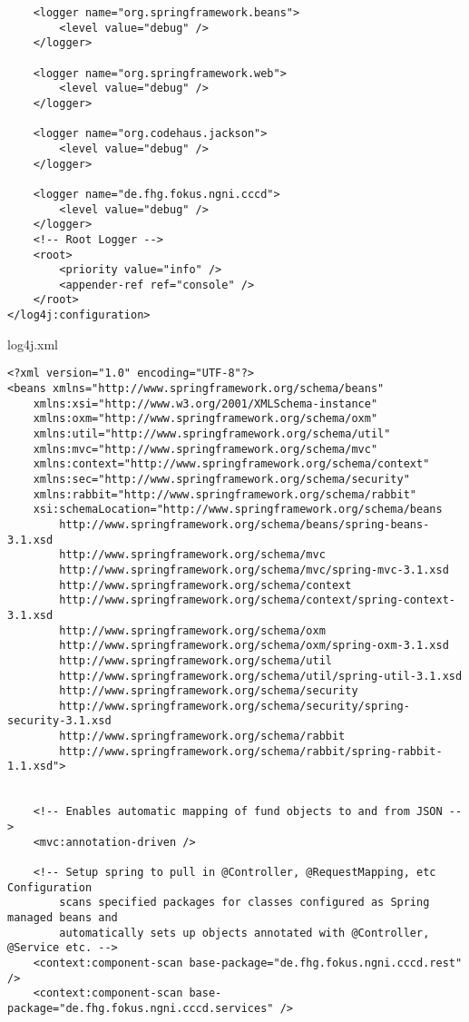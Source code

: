 \begin{appendix}
\begin{code}
\begin{verbatim}
	<logger name="org.springframework.beans">
		<level value="debug" />
	</logger>

	<logger name="org.springframework.web">
		<level value="debug" />
	</logger>

	<logger name="org.codehaus.jackson">
		<level value="debug" />
	</logger>

	<logger name="de.fhg.fokus.ngni.cccd">
		<level value="debug" />
	</logger>
	<!-- Root Logger -->
	<root>
		<priority value="info" />
		<appender-ref ref="console" />
	</root>
</log4j:configuration>
\end{verbatim}
\caption{log4j.xml}
\label{lst:log4j.xml}
\end{code}

\newpage

\begin{code}
\begin{verbatim}
<?xml version="1.0" encoding="UTF-8"?>
<beans xmlns="http://www.springframework.org/schema/beans"
	xmlns:xsi="http://www.w3.org/2001/XMLSchema-instance" 
	xmlns:oxm="http://www.springframework.org/schema/oxm"
	xmlns:util="http://www.springframework.org/schema/util" 
	xmlns:mvc="http://www.springframework.org/schema/mvc"
	xmlns:context="http://www.springframework.org/schema/context"
	xmlns:sec="http://www.springframework.org/schema/security"
	xmlns:rabbit="http://www.springframework.org/schema/rabbit"
	xsi:schemaLocation="http://www.springframework.org/schema/beans 
		http://www.springframework.org/schema/beans/spring-beans-3.1.xsd
		http://www.springframework.org/schema/mvc 
		http://www.springframework.org/schema/mvc/spring-mvc-3.1.xsd
		http://www.springframework.org/schema/context 
		http://www.springframework.org/schema/context/spring-context-3.1.xsd
		http://www.springframework.org/schema/oxm
		http://www.springframework.org/schema/oxm/spring-oxm-3.1.xsd
		http://www.springframework.org/schema/util
  		http://www.springframework.org/schema/util/spring-util-3.1.xsd
  		http://www.springframework.org/schema/security
  		http://www.springframework.org/schema/security/spring-security-3.1.xsd
  		http://www.springframework.org/schema/rabbit
  		http://www.springframework.org/schema/rabbit/spring-rabbit-1.1.xsd">


	<!-- Enables automatic mapping of fund objects to and from JSON -->
	<mvc:annotation-driven />

	<!-- Setup spring to pull in @Controller, @RequestMapping, etc Configuration 
		scans specified packages for classes configured as Spring managed beans and 
		automatically sets up objects annotated with @Controller, @Service etc. -->
	<context:component-scan base-package="de.fhg.fokus.ngni.cccd.rest" />
	<context:component-scan base-package="de.fhg.fokus.ngni.cccd.services" />


\end{verbatim}
\end{code}
\end{appendix}
